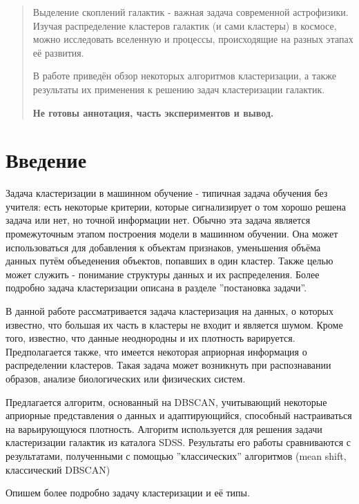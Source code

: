 \documentclass[12pt,fleqn]{article}
\begin{document}
\newpage
\renewcommand{\contentsname}{Содержание}
\tableofcontents

\newpage
\begin{abstract}
    Выделение скоплений галактик - важная задача современной астрофизики. 
    Изучая распределение кластеров галактик (и сами кластеры) в космосе, можно исследовать вселенную и процессы, происходящие на разных этапах её развития. 
    
    В работе приведён обзор некоторых алгоритмов кластеризации, а также результаты их применения к решению задач кластеризации галактик.
    
    \textbf{Не готовы аннотация, часть экспериментов и вывод. }
    
\end{abstract}

\newpage
\section{Введение}
Задача кластеризации в машинном обучение - типичная задача обучения без учителя: есть некоторые критерии, которые сигнализирует о том хорошо решена задача или нет, но точной информации нет. Обычно эта задача является промежуточным этапом построения модели в машинном обучении. Она может использоваться для добавления к объектам признаков, уменьшения объёма данных путём объеденения объектов, попавших в один кластер. Также целью может служить - понимание структуры данных и их распределения. Более подробно задача кластеризации описана в разделе ''постановка задачи''.

В данной работе рассматривается задача кластеризация на данных, о которых известно, что большая их часть в кластеры не входит и является шумом. Кроме того, известно, что данные неоднородны и их плотность варируется. Предполагается также, что имеется некоторая априорная информация о распределении кластеров. Такая задача может возникнуть при распознавании образов, анализе биологических или физических систем.

Предлагается алгоритм, основанный на DBSCAN, учитывающий некоторые априорные представления о данных и адаптирующийся, способный настраиваться на варьирующуюся плотность. Алгоритм используется для решения задачи кластеризации галактик из каталога SDSS. Результаты его работы сравниваются с результатами, полученными с помощью ''классических'' алгоритмов (mean shift, классический DBSCAN)

Опишем более подробно задачу кластеризации и её типы.
\end{document}
